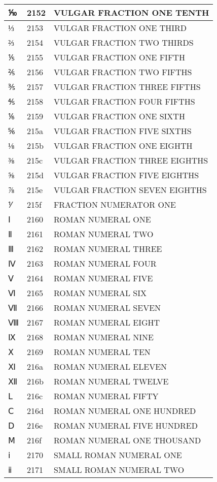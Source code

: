\documentclass[12pt,letterpaper,openany]{book}
\begin{document}
\begin{center}
\begin{supertabular}{|m{0.25in}|m{0.5in}|m{4in}|}
⅒ & 2152 & VULGAR FRACTION ONE TENTH\\\hline
⅓ & 2153 & VULGAR FRACTION ONE THIRD\\\hline
⅔ & 2154 & VULGAR FRACTION TWO THIRDS\\\hline
⅕ & 2155 & VULGAR FRACTION ONE FIFTH\\\hline
⅖ & 2156 & VULGAR FRACTION TWO FIFTHS\\\hline
⅗ & 2157 & VULGAR FRACTION THREE FIFTHS\\\hline
⅘ & 2158 & VULGAR FRACTION FOUR FIFTHS\\\hline
⅙ & 2159 & VULGAR FRACTION ONE SIXTH\\\hline
⅚ & 215a & VULGAR FRACTION FIVE SIXTHS\\\hline
⅛ & 215b & VULGAR FRACTION ONE EIGHTH\\\hline
⅜ & 215c & VULGAR FRACTION THREE EIGHTHS\\\hline
⅝ & 215d & VULGAR FRACTION FIVE EIGHTHS\\\hline
⅞ & 215e & VULGAR FRACTION SEVEN EIGHTHS\\\hline
⅟ & 215f & FRACTION NUMERATOR ONE\\\hline
Ⅰ & 2160 & ROMAN NUMERAL ONE\\\hline
Ⅱ & 2161 & ROMAN NUMERAL TWO\\\hline
Ⅲ & 2162 & ROMAN NUMERAL THREE\\\hline
Ⅳ & 2163 & ROMAN NUMERAL FOUR\\\hline
Ⅴ & 2164 & ROMAN NUMERAL FIVE\\\hline
Ⅵ & 2165 & ROMAN NUMERAL SIX\\\hline
Ⅶ & 2166 & ROMAN NUMERAL SEVEN\\\hline
Ⅷ & 2167 & ROMAN NUMERAL EIGHT\\\hline
Ⅸ & 2168 & ROMAN NUMERAL NINE\\\hline
Ⅹ & 2169 & ROMAN NUMERAL TEN\\\hline
Ⅺ & 216a & ROMAN NUMERAL ELEVEN\\\hline
Ⅻ & 216b & ROMAN NUMERAL TWELVE\\\hline
Ⅼ & 216c & ROMAN NUMERAL FIFTY\\\hline
Ⅽ & 216d & ROMAN NUMERAL ONE HUNDRED\\\hline
Ⅾ & 216e & ROMAN NUMERAL FIVE HUNDRED\\\hline
Ⅿ & 216f & ROMAN NUMERAL ONE THOUSAND\\\hline
ⅰ & 2170 & SMALL ROMAN NUMERAL ONE\\\hline
ⅱ & 2171 & SMALL ROMAN NUMERAL TWO\\\hline

\end{supertabular}
\end{center}
\end{document}
